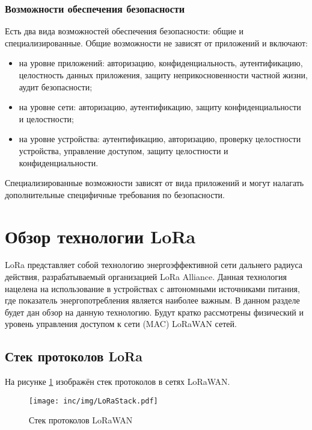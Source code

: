 \subsubsection{Возможности обеспечения безопасности}

Есть два вида возможностей обеспечения безопасности: общие и специализированные.
Общие возможности не зависят от приложений и включают:
\begin{itemize}
	\item на уровне приложений: авторизацию, конфиденциальность, аутентификацию, целостность данных приложения, защиту неприкосновенности частной жизни, аудит безопасности;
	\item на уровне сети: авторизацию, аутентификацию, защиту конфиденциальности и целостности;
	\item на уровне устройства: аутентификацию, авторизацию, проверку целостности устройства, управление доступом, защиту целостности и конфиденциальности.
\end{itemize}

Специализированные возможности зависят от вида приложений и могут налагать дополнительные специфичные требования по безопасности.

\newpage
\section{Обзор технологии LoRa} 

LoRa представляет собой технологию энергоэффективной сети дальнего радиуса действия, разрабатываемый организацией LoRa Alliance.
Данная технология нацелена на использование в устройствах с автономными источниками питания, где показатель энергопотребления является наиболее важным.
В данном разделе будет дан обзор на данную технологию.
Будут кратко рассмотрены физический и уровень управления доступом к сети (MAC) 
LoRaWAN сетей.

\subsection{Стек протоколов LoRa}

На рисунке \ref{fig:lorastack} изображён стек протоколов в сетях LoRaWAN. 

\begin{figure}[!h]
  \centering
  \texttt{[image: inc/img/LoRaStack.pdf]}
	\caption{Стек протоколов LoRaWAN}
  \label{fig:lorastack}
\end{figure}

